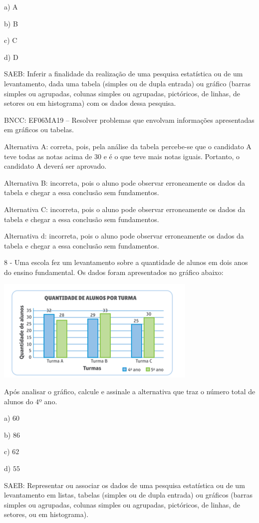 a) A

b) B

c) C

d) D

SAEB: Inferir a finalidade da realização de uma pesquisa estatística ou
de um levantamento, dada uma tabela (simples ou de dupla entrada) ou
gráfico (barras simples ou agrupadas, colunas simples ou agrupadas,
pictóricos, de linhas, de setores ou em histograma) com os dados dessa
pesquisa.

BNCC: EF06MA19 -- Resolver problemas que envolvam informações
apresentadas em gráficos ou tabelas.

Alternativa A: correta, pois, pela análise da tabela percebe-se que o
candidato A teve todas as notas acima de $30$ e é o que teve mais notas
iguais. Portanto, o candidato A deverá ser aprovado.

Alternativa B: incorreta, pois o aluno pode observar erroneamente os
dados da tabela e chegar a essa conclusão sem fundamentos.

Alternativa C: incorreta, pois o aluno pode observar erroneamente os
dados da tabela e chegar a essa conclusão sem fundamentos.

Alternativa d: incorreta, pois o aluno pode observar erroneamente os
dados da tabela e chegar a essa conclusão sem fundamentos.

8 - Uma escola fez um levantamento sobre a quantidade de alunos em dois
anos do ensino fundamental. Os dados foram apresentados no gráfico
abaixo:

\includegraphics[width=3.78125in,height=1.94792in]{./imgSAEB_6_MAT/media/image110.png}

Após analisar o gráfico, calcule e assinale a alternativa que traz o
número total de alunos do $4$º ano.

a) $60$

b) $86$

c) $62$

d) $55$

SAEB: Representar ou associar os dados de uma pesquisa estatística ou de
um levantamento em listas, tabelas (simples ou de dupla entrada) ou
gráficos (barras simples ou agrupadas, colunas simples ou agrupadas,
pictóricos, de linhas, de setores, ou em histograma).

